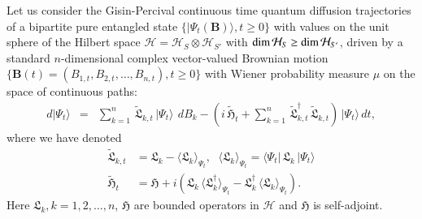 Let us consider  the Gisin-Percival continuous time quantum diffusion trajectories of a bipartite pure entangled state  
$\{\vert\Psi_t(\mathbf{B})\rangle, t\geq 0\}$ with values on the unit sphere of the  Hilbert space  $\mathcal{H}=\mathcal{H}_{S}\otimes \mathcal{H}_{S'}$  with  ${\rm dim}\,{\mathcal{H}_S}\geq {\rm dim}\,{\mathcal{H}_{S'}}$, driven by a standard $n$-dimensional complex vector-valued  Brownian motion $\{\mathbf{B}(t)=(B_{1,t},B_{2,t},\ldots , B_{n,t}), t\geq 0\}$  with Wiener probability measure $\mu$ on the space of continuous paths:
\begin{eqnarray}
d\vert\Psi_t\rangle &=& \sum_{k=1}^n\, \widetilde{\mathfrak{L}}_{k,t}\, \vert\Psi_t\rangle\, \  dB_{k} 
-\left(i\, \widetilde{\mathfrak{H}}_t + \sum_{k=1}^{n}\,  \widetilde{\mathfrak{L}}_{k,t}^\dag\, \widetilde{\mathfrak{L}}_{k,t}\right)\, \vert \Psi_t\rangle\, dt,   \label{chap8-eq7.1}
\end{eqnarray}
where we have denoted 
\begin{align}
		\widetilde{\mathfrak{L}}_{k,t}&=\mathfrak{L}_k-\langle \mathfrak{L}_k \rangle_{\Psi_t},\, \ \ 
		\langle \mathfrak{L}_k \rangle_{\Psi_t}=\langle \Psi_t\vert\, \mathfrak{L}_k\,\vert \Psi_t\rangle  \nonumber \\ 
		\widetilde{\mathfrak{H}}_t&= \mathfrak{H}+i\left(\mathfrak{L}_k\, \langle \mathfrak{L}^\dag_k\rangle_{\Psi_t}-\mathfrak{L}^\dag_k\, \langle \mathfrak{L}_k\rangle_{\Psi_t} \right).   \label{chap8-eq7.2}
\end{align}
Here $\mathfrak{L}_k, k=1,2,\ldots, n$, $\mathfrak{H}$ are bounded operators in  $\mathcal{H}$ and $\mathfrak{H}$ is self-adjoint. 


